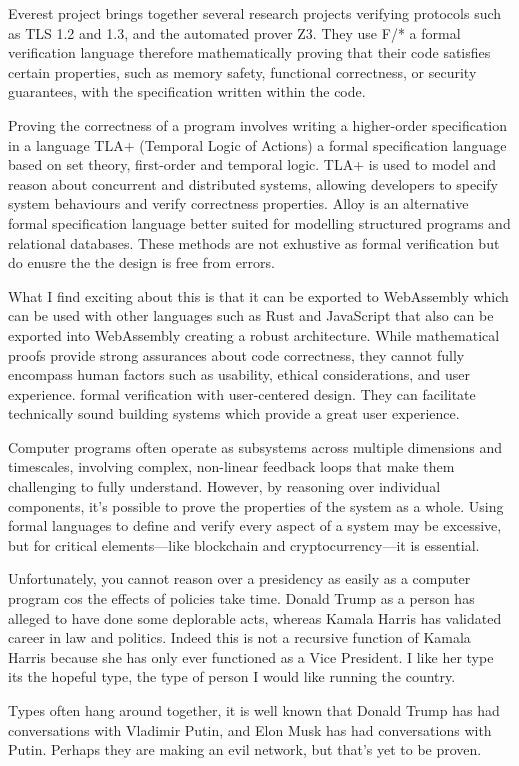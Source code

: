 \documentclass{article}
\begin{document}
Everest project brings together several research projects verifying protocols such as TLS 1.2 and 1.3, and the automated prover Z3. They use F/* a formal verification language therefore mathematically proving that their code satisfies certain properties, such as memory safety, functional correctness, or security guarantees, with the specification written within the code. 

Proving the correctness of a program involves writing a higher-order specification in a language  TLA+ (Temporal Logic of Actions) a formal specification language based on set theory, first-order and temporal logic.  TLA+ is used to model and reason about concurrent and distributed systems, allowing developers to specify system behaviours and verify correctness properties.  Alloy is an alternative formal specification language better suited for modelling structured programs and relational databases. These methods are not exhustive as formal verification but do enusre the the design is free from errors. 

What I find exciting about this is that it can be exported to WebAssembly which can be used with other languages such as Rust and JavaScript that also can be exported into WebAssembly creating a robust architecture. While mathematical proofs provide strong assurances about code correctness, they cannot fully encompass human factors such as usability, ethical considerations, and user experience. formal verification with user-centered design. They can facilitate technically sound building systems which provide a great user experience.

Computer programs often operate as subsystems across multiple dimensions and timescales, involving complex, non-linear feedback loops that make them challenging to fully understand. However, by reasoning over individual components, it's possible to prove the properties of the system as a whole. Using formal languages to define and verify every aspect of a system may be excessive, but for critical elements—like blockchain and cryptocurrency—it is essential. 

Unfortunately, you cannot reason over a presidency as easily as a computer program cos the effects of policies take time. Donald Trump as a person has alleged to have done some deplorable acts, whereas Kamala Harris has validated career in law and politics. Indeed this is not a recursive function of Kamala Harris because she has only ever functioned as a Vice President.  I like her type its the hopeful type, the type of person I would like running the country.  

Types often hang around together, it is well known that Donald Trump has had conversations with Vladimir Putin, and Elon Musk has had conversations with Putin. Perhaps they are making an evil network, but that's yet to be proven.
\end{document}

